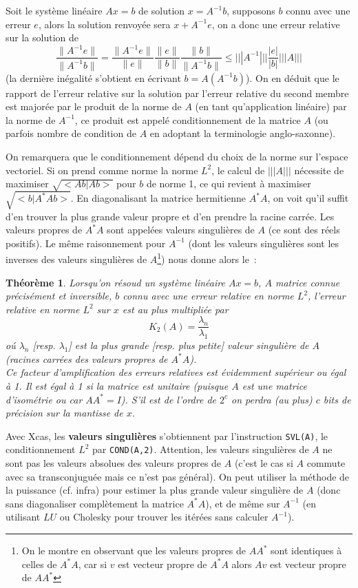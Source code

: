 \documentclass[a4paper,11pt]{book}
\newtheorem{thm}{Théorème}
\begin{document}
\begin{giacjshere}
Soit le syst\`eme lin\'eaire $Ax=b$ de solution $x=A^{-1}b$, 
supposons $b$ connu avec une erreur $e$, alors la solution renvoy\'ee
sera $x+A^{-1}e$, on a donc une erreur relative sur la solution de 
\[ \frac{\|A^{-1}e\|}{\|A^{-1}b\|} = \frac{\|A^{-1}e\|}{\|e\|} 
\frac{\|e\|}{\|b\|}
\frac{\|b\|}{\|A^{-1}b\|}  \leq |||A^{-1}|||  \frac{|e|}{|b|} |||A|||  \]
(la derni\`ere in\'egalit\'e s'obtient en \'ecrivant $b=A(A^{-1}b)$).
On en d\'eduit que le rapport de l'erreur relative sur la solution par l'erreur
relative du second membre est major\'ee par
le produit de la norme de $A$ (en tant qu'application lin\'eaire)
par la norme de $A^{-1}$, ce produit est appel\'e conditionnement
de la matrice $A$ (ou parfois nombre de condition de $A$ en adoptant
la terminologie anglo-saxonne).

On remarquera que le conditionnement d\'epend du choix de la norme sur
l'espace vectoriel.
Si on prend comme norme la norme $L^2$, le calcul de $|||A|||$
n\'ecessite de maximiser $\sqrt{<Ab|Ab>}$ pour $b$ de norme 1, ce qui revient
\`a maximiser $\sqrt{<b|A^* A b>}$. En diagonalisant la matrice hermitienne
$A^* A$, on voit qu'il suffit d'en trouver la plus grande valeur
propre et d'en prendre la racine carr\'ee. Les valeurs propres de
$A^*A$ sont appel\'ees valeurs singuli\`eres de $A$ (ce sont des
r\'eels positifs). Le m\^eme raisonnement pour $A^{-1}$ (dont les
valeurs singuli\`eres sont les inverses des valeurs singuli\`eres 
de $A$\footnote{On le montre en observant que les valeurs propres de 
$AA^*$ sont identiques \`a celles de $A^*A$, car si $v$ est
vecteur propre de $A^*A$ alors $Av$ est vecteur
propre de $AA^*$}) nous donne alors le~:
\begin{thm}
Lorsqu'on r\'esoud un syst\`eme lin\'eaire $Ax=b$, $A$ matrice connue
pr\'ecis\'ement et inversible, $b$ connu avec une erreur relative en
norme $L^2$, l'erreur relative en norme $L^2$ sur $x$ est au plus
multipli\'ee par
\[ K_2(A)= \frac{\lambda_n}{\lambda_1} \]
o\'u $\lambda_n$ [resp. $\lambda_1$] est la plus grande [resp. plus
petite] valeur singuli\`ere de $A$ (racines carr\'ees des
valeurs propres de $A^*A$).\\
Ce facteur d'amplification des erreurs relatives est \'evidemment
sup\'erieur ou \'egal \`a 1. Il est \'egal \`a 1 si la matrice est
unitaire (puisque $A$ est une matrice
d'isométrie ou car $AA^*=I$). 
S'il est de l'ordre de $2^c$ on perdra (au plus) $c$ bits de
pr\'ecision sur la mantisse de $x$.
\end{thm}
Avec Xcas, les {\bf valeurs singuli\`eres} 
s'obtiennent par l'instruction
\verb|SVL(A)|, le conditionnement $L^2$ par \verb|COND(A,2)|.
Attention, les valeurs singuli\`eres de $A$ ne sont pas les valeurs
absolues des valeurs propres de $A$ (c'est le cas si $A$ 
commute avec sa transconjugu\'ee mais ce n'est pas g\'en\'eral).
On peut utiliser la m\'ethode de la puissance (cf. infra) pour estimer la plus
grande valeur singuli\`ere de $A$ (donc sans diagonaliser compl\`etement
la matrice $A^*A$), et de m\^eme sur $A^{-1}$ (en utilisant $LU$
ou Cholesky pour trouver les it\'er\'ees sans calculer $A^{-1}$).


\end{giacjshere}
\end{document}
